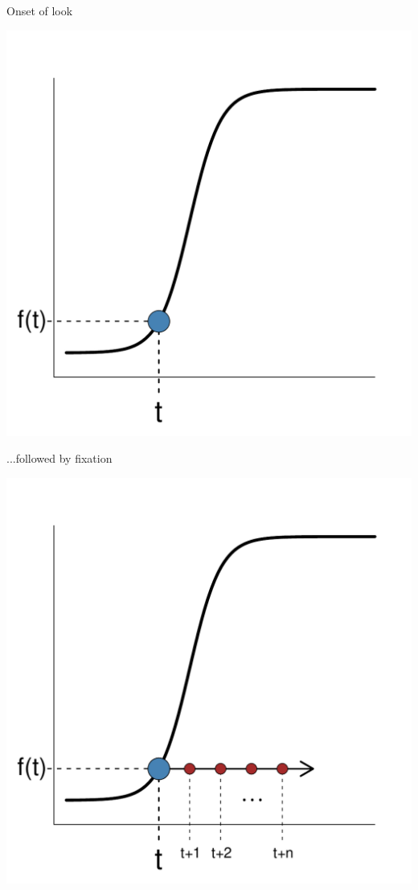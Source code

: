 \documentclass{beamer}
\begin{document}
\begin{frame}{Onset of look}
\vspace{-5mm}
\begin{center}
\includegraphics[scale=0.4]{img/logistic_b.pdf}
\end{center}

\end{frame}

\begin{frame}{...followed by fixation}
\vspace{-5mm}
\begin{center}
\includegraphics[scale=0.4]{img/logistic_c.pdf}
\end{center}
\end{frame}
\end{document}
